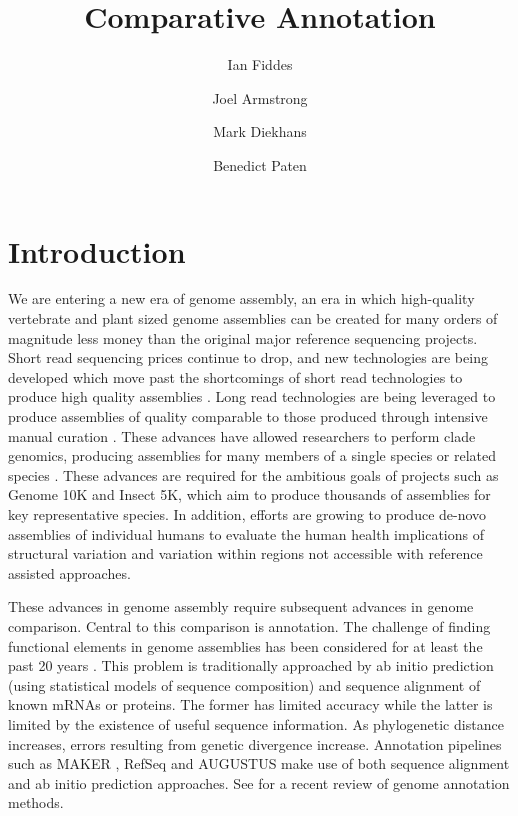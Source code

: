 \documentclass[fleqn,10pt]{wlscirep}
\title{Comparative Annotation}
\author[1,+]{Ian Fiddes}
\author[1,+]{Joel Armstrong}
\author[1,]{Mark Diekhans}
\author[1,*]{Benedict Paten}
\affil[1]{UCSC}
\affil[*]{corresponding.author@email.example}
\affil[+]{these authors contributed equally to this work}
\begin{document}
\flushbottom
\maketitle
\thispagestyle{empty}

\section{Introduction}
	We are entering a new era of genome assembly, an era in which high-quality vertebrate and plant sized genome assemblies can be created for many orders of magnitude less money than the original major reference sequencing projects. Short read sequencing prices continue to drop, and new technologies are being developed which move past the shortcomings of short read technologies to produce high quality assemblies \cite{putnam2016chromosome,10xassembly,Jain128835}. Long read technologies are being leveraged to produce assemblies of quality comparable to those produced through intensive manual curation \cite{gordon2016long}. These advances have allowed researchers to perform clade genomics, producing assemblies for many members of a single species or related species \cite{Thybert158659,jarvis2014whole}. These advances are required for the ambitious goals of projects such as Genome 10K \cite{haussler2009genome} and Insect 5K, which aim to produce thousands of assemblies for key representative species. In addition, efforts are growing to produce de-novo assemblies of individual humans to evaluate the human health implications of structural variation and variation within regions not accessible with reference assisted approaches. 
    
These advances in genome assembly require subsequent advances in genome comparison. Central to this comparison is annotation. The challenge of finding functional elements in genome assemblies has been considered for at least the past 20 years \cite{haussler1996generalized}. This problem is traditionally approached by ab initio prediction (using statistical models of sequence composition) \cite{stanke2004augustus} and sequence alignment of known mRNAs or proteins\cite{Aken01012016}. The former has limited accuracy while the latter is limited by the existence of useful sequence information. As phylogenetic distance increases, errors resulting from genetic divergence increase. Annotation pipelines such as MAKER \cite{cantarel2008maker}, RefSeq \cite{pruitt2006ncbi} and AUGUSTUS \cite{stanke2006gene} make use of both sequence alignment and ab initio prediction approaches. See \cite{hoff2015current} for a recent review of genome annotation methods. 
\end{document}
